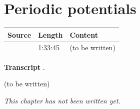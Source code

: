\chapter{Periodic potentials}\label{ch:c41}
\begin{paracol}{2}

\begin{sources}
\begin{tabularx}{\linewidth}{@{}l l L@{}}
\toprule
\textbf{Source} & \textbf{Length} & \textbf{Content}\\
\midrule
{} & 1:33:45 & (to be written)\\
\bottomrule
\end{tabularx}

\smallskip
\textbf{Transcript} .
\end{sources}

\begin{reading}
(to be written)
\end{reading}

\emph{This chapter has not been written yet.}

\flushside
\end{paracol}
